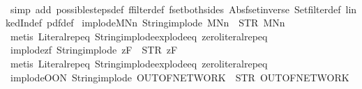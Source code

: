 \begin{isabellebody}
%
\isadelimproof
\ \ %
\endisadelimproof
%
\isatagproof
{}\isamarkupfalse%
\ {\isacharparenleft}simp\ add{\isacharcolon}\ possible{\isacharunderscore}steps{\isacharunderscore}def\ ffilter{\isacharunderscore}def\ fset{\isacharunderscore}both{\isacharunderscore}sides\ Abs{\isacharunderscore}fset{\isacharunderscore}inverse\ Set{\isachardot}filter{\isacharunderscore}def\ linkedIn{\isacharunderscore}def\ pdf{\isacharunderscore}def{\isacharparenright}%
\endisatagproof
{\isafoldproof}%
%
\isadelimproof
\isanewline
%
\endisadelimproof
\isanewline
{}\isamarkupfalse%
\ implode{\isacharunderscore}MNn{}{\isacharcolon}\ {\isachardoublequoteopen}String{\isachardot}implode\ {\isacharprime}{\isacharprime}MNn{}{\isacharprime}{\isacharprime}\ {\isacharequal}\ STR\ {\isacharprime}{\isacharprime}MNn{}{\isacharprime}{\isacharprime}{\isachardoublequoteclose}\isanewline
%
\isadelimproof
\ \ %
\endisadelimproof
%
\isatagproof
{}\isamarkupfalse%
\ {\isacharparenleft}metis\ Literal{\isachardot}rep{\isacharunderscore}eq\ String{\isachardot}implode{\isacharunderscore}explode{\isacharunderscore}eq\ zero{\isacharunderscore}literal{\isachardot}rep{\isacharunderscore}eq{\isacharparenright}%
\endisatagproof
{\isafoldproof}%
%
\isadelimproof
\isanewline
%
\endisadelimproof
\isanewline
{}\isamarkupfalse%
\ implode{\isacharunderscore}{}z{}f{\isacharcolon}\ {\isachardoublequoteopen}String{\isachardot}implode\ {\isacharprime}{\isacharprime}{}z{}F{\isacharprime}{\isacharprime}\ {\isacharequal}\ STR\ {\isacharprime}{\isacharprime}{}z{}F{\isacharprime}{\isacharprime}{\isachardoublequoteclose}\isanewline
%
\isadelimproof
\ \ %
\endisadelimproof
%
\isatagproof
{}\isamarkupfalse%
\ {\isacharparenleft}metis\ Literal{\isachardot}rep{\isacharunderscore}eq\ String{\isachardot}implode{\isacharunderscore}explode{\isacharunderscore}eq\ zero{\isacharunderscore}literal{\isachardot}rep{\isacharunderscore}eq{\isacharparenright}%
\endisatagproof
{\isafoldproof}%
%
\isadelimproof
\isanewline
%
\endisadelimproof
\isanewline
{}\isamarkupfalse%
\ implode{\isacharunderscore}OON{\isacharcolon}\ {\isachardoublequoteopen}String{\isachardot}implode\ {\isacharprime}{\isacharprime}OUT{\isacharunderscore}OF{\isacharunderscore}NETWORK{\isacharprime}{\isacharprime}\ {\isacharequal}\ STR\ {\isacharprime}{\isacharprime}OUT{\isacharunderscore}OF{\isacharunderscore}NETWORK{\isacharprime}{\isacharprime}{\isachardoublequoteclose}\isanewline

\end{isabellebody}
